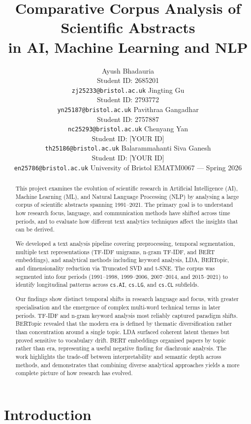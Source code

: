 \documentclass{article}
\title{Comparative Corpus Analysis of Scientific Abstracts\\
       in AI, Machine Learning and NLP}
\author{
  Ayush Bhadauria \\
  Student ID: 2685201 \\
  \texttt{zj25233@bristol.ac.uk}
  \And
  Jingting Gu \\
  Student ID: 2793772 \\
  \texttt{yn25187@bristol.ac.uk}
  \And
  Pavithraa Gangadhar \\
  Student ID: 2757887 \\
  \texttt{nc25293@bristol.ac.uk}
  \AND
  Chenyang Yan \\
  Student ID: [YOUR ID] \\
  \texttt{th25186@bristol.ac.uk}
  \And
  Balarammahanti Siva Ganesh \\
  Student ID: [YOUR ID] \\
  \texttt{en25786@bristol.ac.uk}
  \AND
  University of Bristol \quad EMATM0067 --- Spring 2026
}
\begin{document}
\maketitle

\begin{abstract}
This project examines the evolution of scientific research
in Artificial Intelligence (AI), Machine Learning (ML),
and Natural Language Processing (NLP) by analysing a large
corpus of scientific abstracts spanning 1991--2021. The
primary goal is to understand how research focus, language,
and communication methods have shifted across time periods,
and to evaluate how different text analytics techniques
affect the insights that can be derived.

We developed a text analysis pipeline covering preprocessing,
temporal segmentation, multiple text representations
(TF-IDF unigrams, n-gram TF-IDF, and BERT embeddings), and
analytical methods including keyword analysis, LDA, BERTopic,
and dimensionality reduction via Truncated SVD and t-SNE.
The corpus was segmented into four periods (1991--1998,
1999--2006, 2007--2014, and 2015--2021) to identify
longitudinal patterns across \texttt{cs.AI}, \texttt{cs.LG},
and \texttt{cs.CL} subfields.

Our findings show distinct temporal shifts in research
language and focus, with greater specialisation and the
emergence of complex multi-word technical terms in later
periods. TF-IDF and n-gram keyword analysis most reliably
captured paradigm shifts. BERTopic revealed that the modern
era is defined by thematic diversification rather than
concentration around a single topic. LDA surfaced coherent
latent themes but proved sensitive to vocabulary drift.
BERT embeddings organised papers by topic rather than era,
representing a useful negative finding for diachronic
analysis. The work highlights the trade-off between
interpretability and semantic depth across methods, and
demonstrates that combining diverse analytical approaches
yields a more complete picture of how research has evolved.
\end{abstract}


\section{Introduction}
\end{document}
